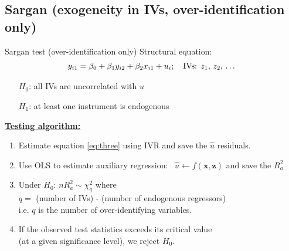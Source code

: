 \documentclass[usenames,dvipsnames]{beamer}
\begin{document}
\subsection{Sargan (exogeneity in IVs, over-identification only)}
\begin{frame}{Sargan test (over-identification only)}
Structural equation: 
\begin{align}
\label{eq:three} y_{i1}=\beta_0+\beta_1 y_{i2} + \beta_2 x_{i1} + u_i; \quad \text{IVs: $z_1$, $z_2$, \dots}
\end{align}
\vspace{-0.2cm}
\begin{itemize}
\item[$H_0$:] all IVs are uncorrelated with $u$
\item[$H_1$:] at least one instrument is endogenous
\end{itemize}
\bigskip
\textbf{\underline{Testing algorithm:}}
\begin{enumerate}
\item Estimate equation \eqref{eq:three} using IVR and save the $\hat{u}$ residuals.
\item Use OLS to estimate auxiliary regression: \ $\hat{u} \leftarrow f(\bm{x, z})$ and save the $R_a^2$
\item Under $H_0$: $nR_a^2 \sim \chi_q^2$ where \\$q =$ (number of IVs) - (number of endogenous regressors) 
 \\i.e. $q$ is the number of over-identifying variables.
\item If the observed test statistics exceeds its critical value \\(at a given significance level), we reject $H_0$.
\end{enumerate}
\end{frame}
\end{document}
